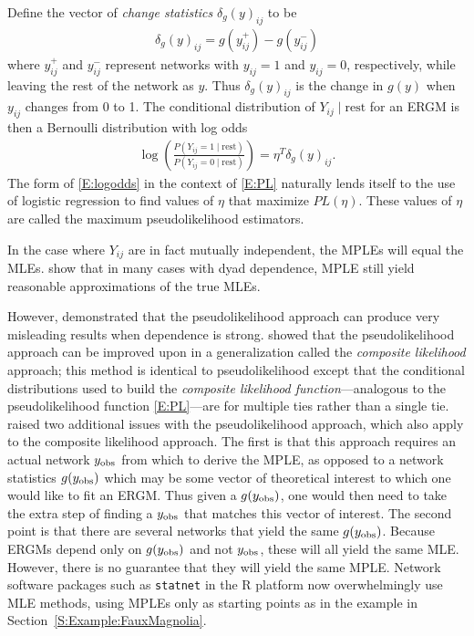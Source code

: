 Define the vector of \textit{change statistics} $\delta_g(y)_{ij}$ to be
\begin{align*}
	\delta_g(y)_{ij} = g(y_{ij}^+) - g(y_{ij}^-)
\end{align*}
where $y_{ij}^+$ and $y_{ij}^-$ represent networks with $y_{ij} = 1$ and $y_{ij} = 0$, 
respectively, while leaving the rest of the network as $y$.  Thus $\delta_g(y)_{ij}$ 
is the change in $g(y)$ when $y_{ij}$ changes from 0 to 1.
The conditional distribution of $Y_{ij} \mid \textrm{rest}$ for an ERGM is then a Bernoulli 
distribution with log odds
\begin{align}
	\log \left ( \frac{P( Y_{ij} =1 \mid \textrm{rest} ) }
				 	 { P( Y_{ij} =0 \mid \textrm{rest} ) } \right ) 
					 			= \eta^T \delta_g(y)_{ij}. \label{E:logodds}
\end{align}
The form of \eqref{E:logodds} in the context of \eqref{E:PL} naturally lends
itself to the use of logistic regression to find values of $\eta$ that
maximize $PL(\eta)$.  These values of $\eta$ are called the maximum pseudolikelihood estimators.

In the case where $Y_{ij}$ are in fact mutually independent, the MPLEs will equal the MLEs.  
\citet{Strauss:1990} show that in 
many cases with dyad dependence, MPLE still yield reasonable approximations of the 
true MLEs.  

However, \citet*{Geyer:1992, Snijders:2002, introp*, Duijn:2009} demonstrated that 
the pseudolikelihood approach can produce very misleading results 
when dependence is strong.  
\citet*{Composite} showed that the pseudolikelihood approach can be 
improved upon in a generalization 
called the \emph{composite likelihood} approach; this method is identical
to pseudolikelihood except that the conditional distributions used to build the \emph{composite likelihood function}---analogous to the pseudolikelihood function \eqref{E:PL}---are for multiple 
ties rather than a single tie.
\citet{Hummel} raised two additional issues with the pseudolikelihood approach, 
which also apply to the composite likelihood approach. 
The first is that this approach requires
an actual network $y_{\text{obs}}$ from which to derive the MPLE, as opposed to a network
statistics $g(y_{\text{obs}})$ which may be some vector of theoretical interest to 
which one would like to fit an ERGM.  Thus given a $g(y_{\text{obs}})$, one would then
need to take the extra step of finding a $y_{\text{obs}}$ that matches this vector of
interest.  The second point is that there are several networks that
yield the same $g(y_{\text{obs}})$.  Because ERGMs depend only on $g(y_{\text{obs}})$ and not $y_{\text{obs}}$,
these will all yield the same MLE.  However, there is no guarantee that they will yield the same MPLE.
Network software packages such as \texttt{statnet} \citep*{statnet:R} in the R 
platform now overwhelmingly use MLE methods, using MPLEs only as starting points
as in the example in Section~\ref{S:Example:FauxMagnolia}.

